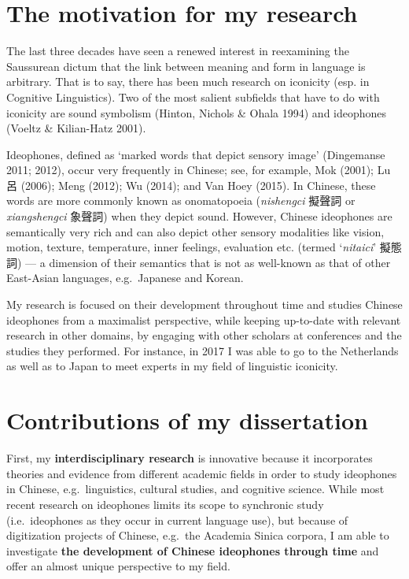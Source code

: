 \documentclass[12pt,]{article}
\theoremstyle{definition}
\theoremstyle{definition}
\theoremstyle{definition}
\theoremstyle{remark}
\begin{document}
\section{The motivation for my
research}\label{the-motivation-for-my-research}

The last three decades have seen a renewed interest in reexamining the
Saussurean dictum that the link between meaning and form in language is
arbitrary. That is to say, there has been much research on iconicity
(esp. in Cognitive Linguistics). Two of the most salient subfields that
have to do with iconicity are sound symbolism (Hinton, Nichols \& Ohala
1994) and ideophones (Voeltz \& Kilian-Hatz 2001).

Ideophones, defined as `marked words that depict sensory image'
(Dingemanse 2011; 2012), occur very frequently in Chinese; see, for
example, Mok (2001); Lu 呂 (2006); Meng (2012); Wu (2014); and Van Hoey
(2015). In Chinese, these words are more commonly known as onomatopoeia
(\emph{nishengci} 擬聲詞 or \emph{xiangshengci} 象聲詞) when they depict
sound. However, Chinese ideophones are semantically very rich and can
also depict other sensory modalities like vision, motion, texture,
temperature, inner feelings, evaluation etc. (termed `\emph{nitaici}'
擬態詞) --- a dimension of their semantics that is not as well-known as
that of other East-Asian languages, e.g.~Japanese and Korean.

My research is focused on their development throughout time and studies
Chinese ideophones from a maximalist perspective, while keeping
up-to-date with relevant research in other domains, by engaging with
other scholars at conferences and the studies they performed. For
instance, in 2017 I was able to go to the Netherlands as well as to
Japan to meet experts in my field of linguistic iconicity.

\section{Contributions of my
dissertation}\label{contributions-of-my-dissertation}

First, my \textbf{interdisciplinary research} is innovative because it
incorporates theories and evidence from different academic fields in
order to study ideophones in Chinese, e.g.~linguistics, cultural
studies, and cognitive science. While most recent research on ideophones
limits its scope to synchronic study (i.e.~ideophones as they occur in
current language use), but because of digitization projects of Chinese,
e.g.~the Academia Sinica corpora, I am able to investigate \textbf{the
development of Chinese ideophones through time} and offer an almost
unique perspective to my field.
\end{document}
